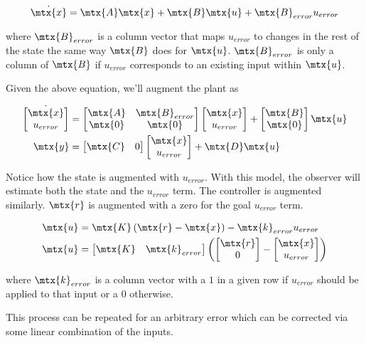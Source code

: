 \begin{equation*}
  \dot{\mtx{x}} = \mtx{A}\mtx{x} + \mtx{B}\mtx{u} + \mtx{B}_{error}u_{error}
\end{equation*}

where $\mtx{B}_{error}$ is a column vector that maps $u_{error}$ to changes in
the rest of the \gls{state} the same way $\mtx{B}$ does for $\mtx{u}$.
$\mtx{B}_{error}$ is only a column of $\mtx{B}$ if $u_{error}$ corresponds to an
existing \gls{input} within $\mtx{u}$.

Given the above equation, we'll augment the \gls{plant} as

\begin{align*}
  \dot{\begin{bmatrix}
    \mtx{x} \\
    u_{error}
  \end{bmatrix}} &=
  \begin{bmatrix}
    \mtx{A} & \mtx{B}_{error} \\
    \mtx{0} & \mtx{0}
  \end{bmatrix}
  \begin{bmatrix}
    \mtx{x} \\
    u_{error}
  \end{bmatrix} +
  \begin{bmatrix}
    \mtx{B} \\
    \mtx{0}
  \end{bmatrix}
  \mtx{u} \\
  \mtx{y} &= \begin{bmatrix}
    \mtx{C} & 0
  \end{bmatrix} \begin{bmatrix}
    \mtx{x} \\
    u_{error}
  \end{bmatrix} + \mtx{D}\mtx{u}
\end{align*}

Notice how the \gls{state} is augmented with $u_{error}$. With this \gls{model},
the \gls{observer} will estimate both the \gls{state} and the $u_{error}$ term.
The controller is augmented similarly. $\mtx{r}$ is augmented with a zero for
the goal $u_{error}$ term.

\begin{align*}
  \mtx{u} &= \mtx{K} \left(\mtx{r} - \mtx{x}\right) - \mtx{k}_{error}u_{error}
    \\
  \mtx{u} &=
  \begin{bmatrix}
    \mtx{K} & \mtx{k}_{error}
  \end{bmatrix}
  \left(\begin{bmatrix}
    \mtx{r} \\
    0
  \end{bmatrix} -
  \begin{bmatrix}
    \mtx{x} \\
    u_{error}
  \end{bmatrix}\right)
\end{align*}

where $\mtx{k}_{error}$ is a column vector with a $1$ in a given row if
$u_{error}$ should be applied to that \gls{input} or a $0$ otherwise.

This process can be repeated for an arbitrary \gls{error} which can be corrected
via some linear combination of the \glspl{input}.
